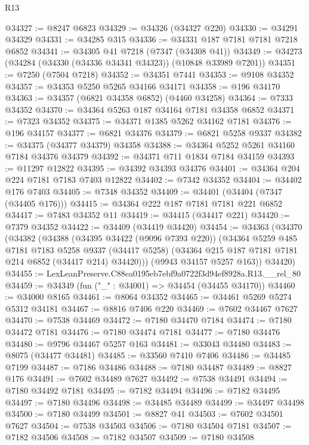 \begin{lexlean}{R13}
\begin{coremodule}
@34327 := @8247 @6823
@34329 := @34326 (@34327 @220)
@34330 := @34291 @34329
@34331 := @34285 @315
@34336 := @34331 @187 @7181 @7181 @7218 @6852
@34341 := @34305 @41 @7218 (@7347 (@34308 @41))
@34349 := @34273 (@34284 (@34330 (@34336 @34341 @34323)) (@10848 @33989 @7201))
@34351 := @7250 (@7504 @7218)
@34352 := @34351 @7441
@34353 := @9108 @34352
@34357 := @34353 @5250 @5265 @34166 @34171
@34358 := @196 @34170
@34363 := @34357 (@6821 @34358 @6852) (@4460 @34258)
@34364 := @7333 @34352
@34370 := @34364 @5263 @187 @34164 @7181 @34358 @6852
@34371 := @7323 @34352
@34375 := @34371 @1385 @5262 @34162 @7181
@34376 := @196 @34157
@34377 := @6821 @34376
@34379 := @6821 @5258 @9337
@34382 := @34375 (@34377 @34379) @34358
@34388 := @34364 @5252 @5261 @34160 @7184 @34376 @34379
@34392 := @34371 @711 @1834 @7184 @34159
@34393 := @11297 @12822
@34395 := @34392 @34393 @34376
@34401 := @34364 @204 @224 @7181 @7183 @7403 @12822
@34402 := @7342 @34352
@34404 := @34402 @176 @7403
@34405 := @7348 @34352
@34409 := @34401 (@34404 (@7347 (@34405 @176)))
@34415 := @34364 @222 @187 @7181 @7181 @221 @6852
@34417 := @7483 @34352 @11
@34419 := @34415 (@34417 @221)
@34420 := @7379 @34352
@34422 := @34409 (@34419 @34420)
@34454 := @34363
    (@34370
      (@34382
        (@34388
          (@34395 @34422 (@9096 @7393 @220))
          (@34364
            @5259
            @485
            @7181
            @7183
            @5258
            @9337
            (@34417 @5258)
            (@34364 @215 @187 @7181 @7181 @214 @6852 (@34417 @214) @34420)))
        (@9943 @34157 @5257 @163))
      @34420)
@34455 := LexLeanPreserve.C88ea0195eb7ebf9a0722f3d94ef8928a.R13.__rel_80
@34459 := @34349 (fun ("_" : @34001) => @34454 (@34455 @34170))
@34460 := @34000 @8165
@34461 := @8064 @34352
@34465 := @34461 @5269 @5274 @5312 @34181
@34467 := @8816 @7406 @220
@34469 := @7602 @34467 @7627
@34470 := @7538 @34469
@34472 := @7180 @34470 @7184
@34474 := @7180 @34472 @7181
@34476 := @7180 @34474 @7181
@34477 := @7180 @34476
@34480 := @9796 @34467 @5257 @163
@34481 := @33043 @34480
@34483 := @8075 (@34477 @34481)
@34485 := @33560 @7410 @7406
@34486 := @34485 @7199
@34487 := @7186 @34486
@34488 := @7180 @34487
@34489 := @8827 @176
@34491 := @7602 @34489 @7627
@34492 := @7538 @34491
@34494 := @7180 @34492 @7181
@34495 := @7182 @34494
@34496 := @7182 @34495
@34497 := @7180 @34496
@34498 := @34485 @34489
@34499 := @34497 @34498
@34500 := @7180 @34499
@34501 := @8827 @41
@34503 := @7602 @34501 @7627
@34504 := @7538 @34503
@34506 := @7180 @34504 @7181
@34507 := @7182 @34506
@34508 := @7182 @34507
@34509 := @7180 @34508

\end{coremodule}
\end{lexlean}
